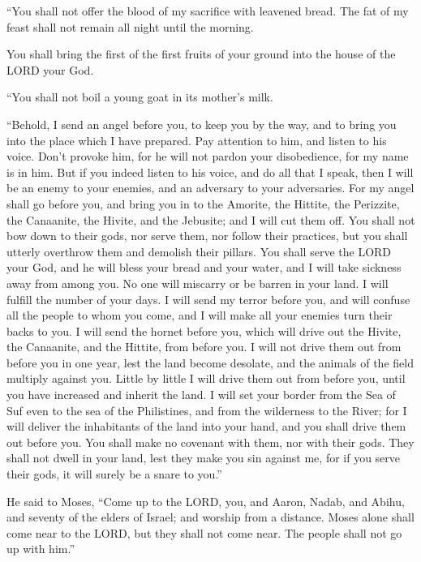 \myverse{}“You shall not offer the blood of my sacrifice with leavened
bread. The fat of my feast shall not remain all night until the morning.


\myverse{}You shall bring the first of the first fruits of your ground
into the house of the LORD your God.

“You shall not boil a young goat in its mother’s milk.


\myverse{}“Behold, I send an angel before you, to keep you by the way,
and to bring you into the place which I have prepared.
\myverse{}Pay attention to him, and listen to his voice. Don’t provoke him, for he
will not pardon your disobedience, for my name is in him.
\myverse{}But if you indeed listen to his voice, and do all that I speak, then I will
be an enemy to your enemies, and an adversary to your adversaries.
\myverse{}For my angel shall go before you, and bring you in to the Amorite, the Hittite,
the Perizzite, the Canaanite, the Hivite, and the Jebusite; and I will cut them off.
\myverse{}You shall not bow down to their gods, nor serve them, nor follow their practices,
but you shall utterly overthrow them and demolish their pillars.
\myverse{}You shall serve the LORD your God, and he will bless your bread and your
water, and I will take sickness away from among you.
\myverse{}No one will miscarry or be barren in your land. I will fulfill the number
of your days.
\myverse{}I will send my terror before you, and will confuse all the people to whom
you come, and I will make all your enemies turn their backs to you.
\myverse{}I will send the hornet before you, which will drive out the Hivite, the Canaanite,
and the Hittite, from before you.
\myverse{}I will not drive them out from before you in one year, lest the land become
desolate, and the animals of the field multiply against you. \myverse{}Little by little I will drive them out from before you, until you have increased
and inherit the land.
\myverse{}I will set your border from the Sea of Suf even to the sea of the Philistines,
and from the wilderness to the River; for I will deliver the inhabitants of the land into your hand, and
you shall drive them out before you.
\myverse{}You shall make no covenant with them, nor with their gods.
\myverse{}They shall not dwell in your land, lest they make you sin against me, for
if you serve their gods, it will surely be a snare to you.”


\mychapter{} \myverse*{}He said to Moses, “Come up to the LORD, you, and Aaron, Nadab,
and Abihu, and seventy of the elders of Israel; and worship from a distance.
\myverse{}Moses alone shall come near to the LORD, but they shall not come near. The
people shall not go up with him.”


